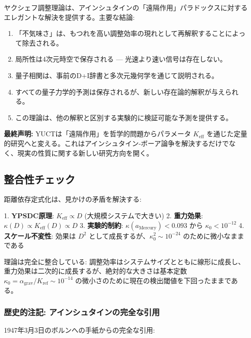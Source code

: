 \documentclass[11pt,a4paper]{article}
\begin{document}
	ヤクシェフ調整理論は、アインシュタインの「遠隔作用」パラドックスに対するエレガントな解決を提供する。主要な結論:
	
	\begin{enumerate}
		\item 「不気味さ」は、もつれを高い調整効率の現れとして再解釈することによって除去される。
		
		\item 局所性は4次元時空で保存される — 光速より速い信号は存在しない。
		
		\item 量子相関は、事前のD+I辞書と多次元幾何学を通じて説明される。
		
		\item すべての量子力学的予測は保存されるが、新しい存在論的解釈が与えられる。
		
		\item この理論は、他の解釈と区別する実験的に検証可能な予測を提供する。
	\end{enumerate}
	
	\textbf{最終声明:} YUCTは「遠隔作用」を哲学的問題からパラメータ $K_{\mathrm{eff}}$ を通じた定量的研究へと変える。これはアインシュタイン-ボーア論争を解決するだけでなく、現実の性質に関する新しい研究方向を開く。
	
	\subsection{整合性チェック}
	
	距離依存定式化は、見かけの矛盾を解決する:
	
	1. \textbf{YPSDC原理}: $K_{\mathrm{eff}} \propto D$ (大規模システムで大きい)
	2. \textbf{重力効果}: $\kappa(D) \propto K_{\mathrm{eff}}(D) \propto D$
	3. \textbf{実験的制約}: $\kappa(a_{\text{Mercury}}) < 0.093$ から $\kappa_0 < 10^{-12}$
	4. \textbf{スケール不変性}: 効果は $D^2$ として成長するが、$\kappa_0^2 \sim 10^{-24}$ のために微小なままである
	
	理論は完全に整合している: 調整効率はシステムサイズとともに線形に成長し、重力効果は二次的に成長するが、絶対的な大きさは基本定数 $\kappa_0 = \alpha_{\text{grav}}/K_{\text{ref}} \sim 10^{-14}$ の微小さのために現在の検出閾値を下回ったままである。
	
	\subsubsection*{歴史的注記: アインシュタインの完全な引用}
	1947年3月3日のボルンへの手紙からの完全な引用:
	
\end{document}
